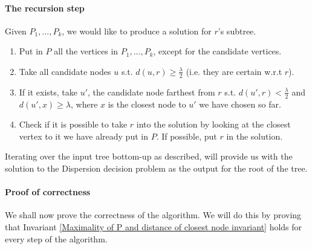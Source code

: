 \documentclass[11pt,a4paper]{article}
\theoremstyle{definition}
\theoremstyle{remark}
\begin{document}
\paragraph{The recursion step} Given $P_{1},...,P_{k}$, we would like to produce a solution for $r$'s subtree.
\begin{enumerate}
\item Put in $P$ all the vertices in $P_{1},...,P_{k}$, except for the candidate vertices.
\item Take all candidate nodes $u$ s.t. $d(u,r) \geq \frac{\lambda}{2}$ (i.e. they are certain w.r.t $r$).
\item If it exists, take $u'$, the candidate node farthest from $r$ s.t. $d(u',r) < \frac{\lambda}{2}$ and $d(u',x)\geq \lambda$, where $x$ is the closest node to $u'$ we have chosen so far.
\item Check if it is possible to take $r$ into the solution by looking at the closest vertex to it we have already put in $P$. If possible, put $r$ in the solution.
\end{enumerate}
Iterating over the input tree bottom-up as described, will provide us with the solution to the Dispersion decision problem as the output for the root of the tree.

\paragraph{Proof of correctness}
We shall now prove the correctness of the algorithm. We will do this by proving that Invariant \ref{Maximality of P and distance of closest node invariant} holds for every step of the algorithm.
\end{document}
